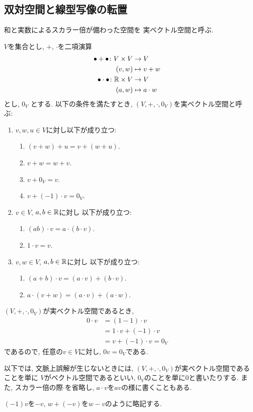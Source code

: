 \subsection{双対空間と線型写像の転置}
和と実数によるスカラー倍が備わった空間を
実ベクトル空間と呼ぶ.
\begin{definition}
  $V$を集合とし,
  $+$, $\cdot$を二項演算
  \begin{align*}
    \bullet + \bullet \colon V\times V &\to V\\
    (v,w)&\mapsto v+w\\
    \bullet \cdot \bullet \colon \mathbb{R}\times V &\to V\\
    (a,w)&\mapsto a\cdot w
  \end{align*}
  とし,
  $0_V$
  とする.
  以下の条件を満たすとき,
  $(V,+,\cdot,0_V)$を実ベクトル空間と呼ぶ:
  \begin{enumerate}
  \item $v,w,u\in V$に対し以下が成り立つ:
    \begin{enumerate}
    \item $(v+w)+u=v+(w+u)$.
    \item $v+w=w+v$.
    \item $v+0_V=v$.
    \item $v+(-1)\cdot v=0_V$.
    \end{enumerate}
  \item $v\in V$, $a,b\in\mathbb{R}$に対し
    以下が成り立つ:
    \begin{enumerate}
    \item $(ab)\cdot v=a\cdot (b\cdot v)$.
    \item $1\cdot v=v$.
    \end{enumerate}      
  \item $v,w \in V$, $a,b\in\mathbb{R}$に対し
    以下が成り立つ:
    \begin{enumerate}
    \item $(a+b)\cdot v=(a\cdot v) + (b\cdot v)$.
    \item $a\cdot (v+w)=(a\cdot v) + (a\cdot w)$.
    \end{enumerate}      
  \end{enumerate}
\end{definition}
\begin{remark}
  $(V,+,\cdot,0_V)$が実ベクトル空間であるとき,
  \begin{align*}
    0\cdot v
    &=(1-1)\cdot v\\
    &=1\cdot v + (-1)\cdot v\\
    &=v+ (-1)\cdot v= 0_V
  \end{align*}
  であるので,
  任意の$v\in V$に対し, $0v=0_V$である.
\end{remark}
\begin{remark}
  以下では, 文脈上誤解が生じないときには,
  $(V,+,\cdot,0_V)$が実ベクトル空間であることを単に
  $V$がベクトル空間であるといい,
  $0_V$のことを単に$0$と書いたりする.
  また, スカラー倍の際$\cdot$を省略し, $a\cdot v$を$av$の様に書くこともある.
\end{remark}
\begin{remark}
  $(-1)v$を$-v$, $w+(-v)$を$w-v$のように略記する.
\end{remark}


